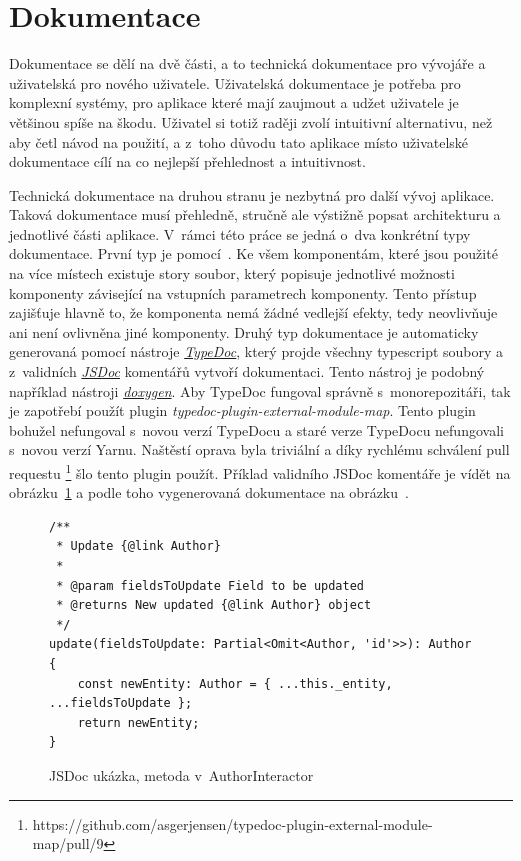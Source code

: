 \section{Dokumentace}
\label{sc:documentation}
Dokumentace se dělí na dvě části, a to technická dokumentace pro vývojáře a uživatelská pro nového uživatele. Uživatelská dokumentace je potřeba pro komplexní systémy, pro aplikace které mají zaujmout a udžet uživatele je většinou spíše na škodu. Uživatel si totiž raději zvolí intuitivní alternativu, než aby četl návod na použití, a z~toho důvodu tato aplikace místo uživatelské dokumentace cílí na co nejlepší přehlednost a intuitivnost.

Technická dokumentace na druhou stranu je nezbytná pro další vývoj aplikace. Taková dokumentace musí přehledně, stručně ale výstižně popsat architekturu a jednotlivé části aplikace. V~rámci této práce se jedná o~dva konkrétní typy dokumentace. První typ je pomocí~. Ke všem komponentám, které jsou použité na více místech existuje story soubor, který popisuje jednotlivé možnosti komponenty závisející na vstupních parametrech komponenty. Tento přístup zajišťuje hlavně to, že komponenta nemá žádné vedlejší efekty, tedy neovlivňuje ani není ovlivněna jiné komponenty. Druhý typ dokumentace je automaticky generovaná pomocí nástroje \href{https://typedoc.org/}{\emph{TypeDoc}}, který projde všechny typescript soubory a z~validních \href{https://jsdoc.app/}{\emph{JSDoc}} komentářů vytvoří dokumentaci. Tento nástroj je podobný například nástroji \href{http://www.doxygen.nl/}{\emph{doxygen}}. Aby TypeDoc fungoval správně s~monorepozitáři, tak je zapotřebí použít plugin \emph{typedoc-plugin-external-module-map}. Tento plugin bohužel nefungoval s~novou verzí TypeDocu a staré verze TypeDocu nefungovali s~novou verzí Yarnu. Naštěstí oprava byla triviální a díky rychlému schválení pull requestu \footnote{https://github.com/asgerjensen/typedoc-plugin-external-module-map/pull/9} šlo tento plugin použít. Příklad validního JSDoc komentáře je vídět na obrázku~\ref{code:jsdoc} a podle toho vygenerovaná dokumentace na obrázku~\cite{fig:documentation_example}.

\begin{figure}[h!]
    \centering
    \begin{verbatim}
/**
 * Update {@link Author}
 *
 * @param fieldsToUpdate Field to be updated
 * @returns New updated {@link Author} object
 */
update(fieldsToUpdate: Partial<Omit<Author, 'id'>>): Author {
    const newEntity: Author = { ...this._entity, ...fieldsToUpdate };
    return newEntity;
}
    \end{verbatim}
    \caption{JSDoc ukázka, metoda v~AuthorInteractor}
    \label{code:jsdoc}
\end{figure}


